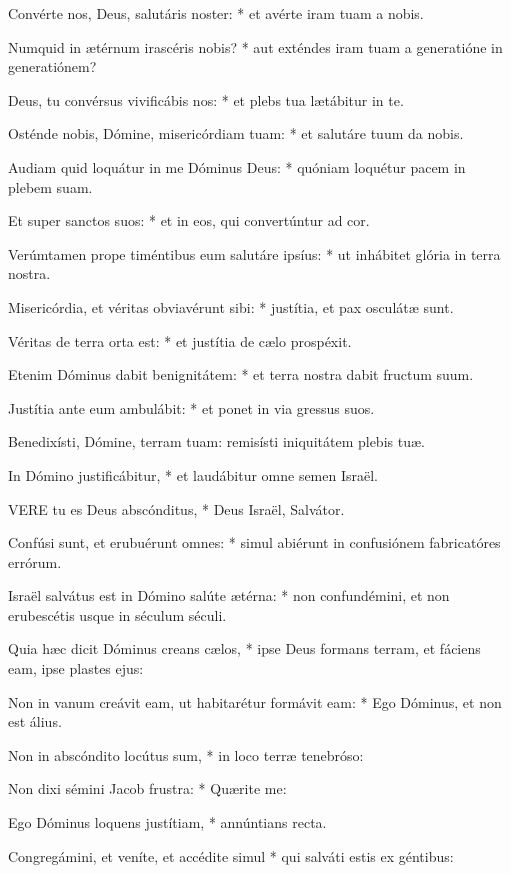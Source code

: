 Convérte nos, Deus, salutáris noster: * et avérte iram tuam a nobis.

Numquid in ætérnum irascéris nobis? * aut exténdes iram tuam a generatióne in generatiónem?

Deus, tu convérsus vivificábis nos: * et plebs tua lætábitur in te.

Osténde nobis, Dómine, misericórdiam tuam: * et salutáre tuum da nobis.

Audiam quid loquátur in me Dóminus Deus: * quóniam loquétur pacem in plebem suam.

Et super sanctos suos: * et in eos, qui convertúntur ad cor.

Verúmtamen prope timéntibus eum salutáre ipsíus: * ut inhábitet glória in terra nostra.

Misericórdia, et véritas obviavérunt sibi: * justítia, et pax osculátæ sunt.

Véritas de terra orta est: * et justítia de cælo prospéxit.

Etenim Dóminus dabit benignitátem: * et terra nostra dabit fructum suum.

Justítia ante eum ambulábit: * et ponet in via gressus suos.

 Benedixísti, Dómine, terram tuam: remisísti iniquitátem plebis tuæ.

 In Dómino justificábitur, * et laudábitur omne semen Israël.


\lettrine[lines=2]{V}{ERE} tu es Deus abscónditus, * Deus Israël, Salvátor.

Confúsi sunt, et erubuérunt omnes: * simul abiérunt in confusiónem fabricatóres errórum.

Israël salvátus est in Dómino salúte ætérna: * non confundémini, et non erubescétis usque in séculum séculi.

Quia hæc dicit Dóminus creans cælos, * ipse Deus formans terram, et fáciens eam, ipse plastes ejus:

Non in vanum creávit eam, ut habitarétur formávit eam: * Ego Dóminus, et non est álius.

Non in abscóndito locútus sum, * in loco terræ tenebróso:

Non dixi sémini Jacob frustra: * Quærite me:

Ego Dóminus loquens justítiam, * annúntians recta.

Congregámini, et veníte, et accédite simul * qui salváti estis ex géntibus:

